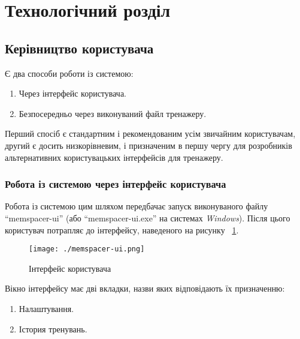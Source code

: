 \section{Технологічний розділ}
\subsection{Керівництво користувача}
Є два способи роботи із системою:
\begin{enumerate}
  \item Через інтерфейс користувача.
  \item Безпосередньо через виконуваний файл тренажеру.
\end{enumerate}

Перший спосіб є стандартним і рекомендованим усім звичайним користувачам, другий є досить низкорівневим, і призначеним в першу чергу для розробників альтернативних користувацьких інтерфейсів для тренажеру.
\subsubsection{Робота із системою через інтерфейс користувача}
Робота із системою цим шляхом передбачає запуск виконуваного файлу ``memspacer-ui'' (або ``memspacer-ui.exe'' на системах \emph{Windows}). Після цього користувач потрапляє до інтерфейсу, наведеного на рисунку ~\ref{fig:memspacer-ui}.
\begin{figure}[here]
  \caption{Інтерфейс користувача}
  \centering\texttt{[image: ./memspacer-ui.png]}
  \label{fig:memspacer-ui}
\end{figure}

Вікно інтерфейсу має дві вкладки, назви яких відповідають їх призначенню:
\begin{enumerate}
  \item Налаштування.
  \item Істория тренувань.
\end{enumerate}

